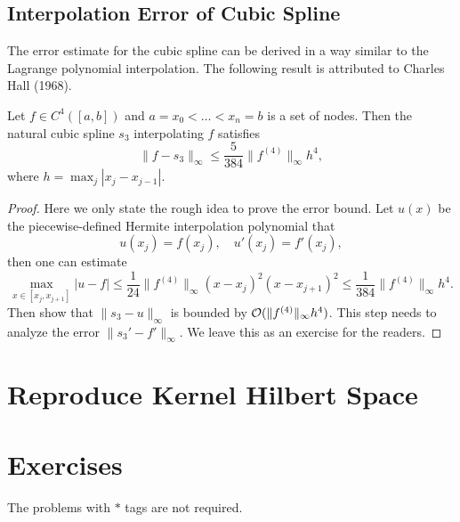 \subsection{Interpolation Error of Cubic Spline}
The error estimate for the cubic spline can be derived in a way similar to the Lagrange polynomial interpolation. The following result is attributed to Charles Hall (1968).
\begin{theorem}\label{THM: ERROR CUBIC SPLINE}
    Let $f\in C^4([a, b])$ and $a = x_0 < \dots < x_n = b$ is a set of nodes. Then the natural cubic spline $s_3$ interpolating $f$ satisfies 
    \begin{equation}
        \|f - s_3\|_{\infty} \le \frac{5}{384}\|f^{(4)}\|_{\infty} h^4,
    \end{equation}
    where $h = \max_j |x_j - x_{j-1}|$.
\end{theorem}
\begin{proof}
    Here we only state the rough idea to prove the error bound. Let $u(x)$ be the piecewise-defined Hermite interpolation polynomial that 
    \begin{equation}
        u(x_j)=f(x_j), \quad u'(x_j) = f'(x_j),
    \end{equation}
    then one can estimate 
    \begin{equation}
        \max_{x\in [x_j, x_{j+1}]} |u-f|\le  \frac{1}{24}\|f^{(4)}\|_{\infty} (x - x_j)^2 (x - x_{j+1})^2 \le \frac{1}{384}\|f^{(4)}\|_{\infty} h^4.
    \end{equation}
    Then show that $\|s_3 - u\|_{\infty}$ is bounded by $\mathcal O(\|f^{(4)}\|_{\infty} h^4)$. This step needs to analyze the error $\|s_3' - f'\|_{\infty}$. We leave this as an exercise for the readers.
\end{proof}

\section{Reproduce Kernel Hilbert Space}


\section{Exercises}
The problems with $\ast$ tags are not required.
